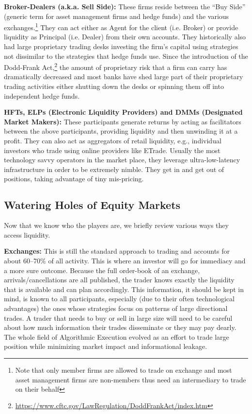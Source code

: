 \pagebreak



\noindent\textbf{Broker-Dealers (a.k.a. Sell Side):} These firms reside between the ``Buy Side'' (generic term for asset management firms and hedge funds) and the various exchanges.\footnote{Note that only member firms are allowed to trade on exchange and most asset management firms are non-members thus need an intermediary to trade on their behalf} They can act either as Agent for the client (i.e. Broker) or provide liquidity as Principal (i.e. Dealer) from their own accounts. They historically also had large proprietary trading desks investing the firm's capital using strategies not dissimilar to the strategies that hedge funds use. Since the introduction of the Dodd-Frank Act,\footnote{\url{https://www.cftc.gov/LawRegulation/DoddFrankAct/index.htm}} the amount of proprietary risk that a firm can carry has dramatically decreased and most banks have shed large part of their proprietary trading activities either shutting down the desks or spinning them off into independent hedge funds. \twomedskip


\noindent\textbf{HFTs,  ELPs (Electronic Liquidity Providers) and  DMMs (Designated Market Makers):} These participants generate returns by acting as facilitators between the above participants, providing liquidity and then unwinding it at a profit. They can also act as aggregators of retail liquidity, e.g., individual investors who trade using online providers like ETrade. Usually the most technology savvy operators in the market place, they leverage ultra-low-latency infrastructure in order to be extremely nimble. They get in and get out of positions, taking advantage of tiny mis-pricing. 



\subsection{Watering Holes of Equity Markets\label{sec:watering}}

Now that we know who the players are, we briefly review various ways they access liquidity. \twomedskip

\noindent\textbf{Exchanges:} This is still the standard approach to trading and accounts for about 60--70\% of all activity. This is where an investor will go for immediacy and a more sure outcome. Because the full order-book of an exchange, arrivals/cancellations are all published, the trader knows exactly the liquidity that is available and can plan accordingly. This information, it should be kept in mind, is known to all participants, especially (due to their often technological advantages) the ones whose strategies focus on patterns of large directional trades. A trader that needs to buy or sell in large size will need to be careful about how much information their trades disseminate or they may pay dearly. The whole field of Algorithmic Execution evolved as an effort to trade large position while minimizing market impact and informational leakage.


